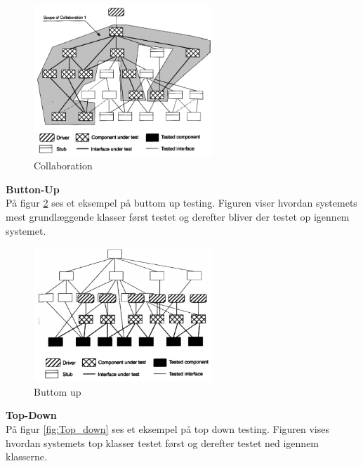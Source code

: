 \vspace{-5pt}
\begin{figure}[H]
	\centering
	\includegraphics[width=0.6\textwidth]{Billeder/Test/collaboration.png}
	\vspace{-5pt}
	\caption{Collaboration}
	\label{fig:Collaboration}
\end{figure}


\textbf{Button-Up}\\
På figur \ref{fig:Buttom_up} ses et eksempel på buttom up testing. Figuren viser hvordan systemets mest grundlæggende klasser først testet og derefter bliver der testet op igennem systemet. 

\begin{figure}[H]
	\centering
	\includegraphics[width=0.6\textwidth]{Billeder/Test/buttom-up.png}
	\vspace{-5pt}
	\caption{Buttom up}
	\label{fig:Buttom_up}
\end{figure}

\newpage

\textbf{Top-Down}\\
På figur \ref{fig:Top_down} ses et eksempel på top down testing. Figuren vises hvordan systemets top klasser testet først og derefter testet ned igennem klasserne.

